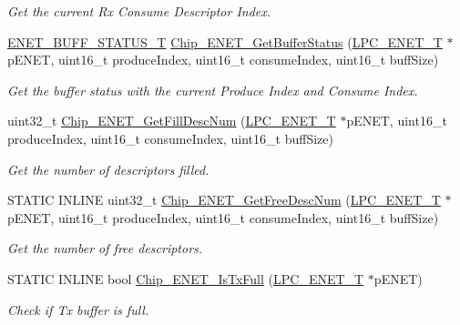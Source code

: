 \begin{DoxyCompactItemize}
\begin{DoxyCompactList}\small\item\em Get the current Rx Consume Descriptor Index. \end{DoxyCompactList}\item 
\hyperlink{group___e_n_e_t__17_x_x__40_x_x_gab29d71439401a8d4f68643acfd10959b}{E\+N\+E\+T\+\_\+\+B\+U\+F\+F\+\_\+\+S\+T\+A\+T\+U\+S\+\_\+\+T} \hyperlink{group___e_n_e_t__17_x_x__40_x_x_gafed5419d7a6be4580641e557429a63ad}{Chip\+\_\+\+E\+N\+E\+T\+\_\+\+Get\+Buffer\+Status} (\hyperlink{struct_l_p_c___e_n_e_t___t}{L\+P\+C\+\_\+\+E\+N\+E\+T\+\_\+\+T} $\ast$p\+E\+N\+E\+T, uint16\+\_\+t produce\+Index, uint16\+\_\+t consume\+Index, uint16\+\_\+t buff\+Size)
\begin{DoxyCompactList}\small\item\em Get the buffer status with the current Produce Index and Consume Index. \end{DoxyCompactList}\item 
uint32\+\_\+t \hyperlink{group___e_n_e_t__17_x_x__40_x_x_gac5f44f20f55847c4c9b9906f051aeca3}{Chip\+\_\+\+E\+N\+E\+T\+\_\+\+Get\+Fill\+Desc\+Num} (\hyperlink{struct_l_p_c___e_n_e_t___t}{L\+P\+C\+\_\+\+E\+N\+E\+T\+\_\+\+T} $\ast$p\+E\+N\+E\+T, uint16\+\_\+t produce\+Index, uint16\+\_\+t consume\+Index, uint16\+\_\+t buff\+Size)
\begin{DoxyCompactList}\small\item\em Get the number of descriptors filled. \end{DoxyCompactList}\item 
S\+T\+A\+T\+I\+C I\+N\+L\+I\+N\+E uint32\+\_\+t \hyperlink{group___e_n_e_t__17_x_x__40_x_x_ga4d0afde7abd542590c1bb53fba4d90b1}{Chip\+\_\+\+E\+N\+E\+T\+\_\+\+Get\+Free\+Desc\+Num} (\hyperlink{struct_l_p_c___e_n_e_t___t}{L\+P\+C\+\_\+\+E\+N\+E\+T\+\_\+\+T} $\ast$p\+E\+N\+E\+T, uint16\+\_\+t produce\+Index, uint16\+\_\+t consume\+Index, uint16\+\_\+t buff\+Size)
\begin{DoxyCompactList}\small\item\em Get the number of free descriptors. \end{DoxyCompactList}\item 
S\+T\+A\+T\+I\+C I\+N\+L\+I\+N\+E bool \hyperlink{group___e_n_e_t__17_x_x__40_x_x_ga593f01cc1a9e665c8c3293c0599b254c}{Chip\+\_\+\+E\+N\+E\+T\+\_\+\+Is\+Tx\+Full} (\hyperlink{struct_l_p_c___e_n_e_t___t}{L\+P\+C\+\_\+\+E\+N\+E\+T\+\_\+\+T} $\ast$p\+E\+N\+E\+T)
\begin{DoxyCompactList}\small\item\em Check if Tx buffer is full. \end{DoxyCompactList}\item 

\end{DoxyCompactItemize}
